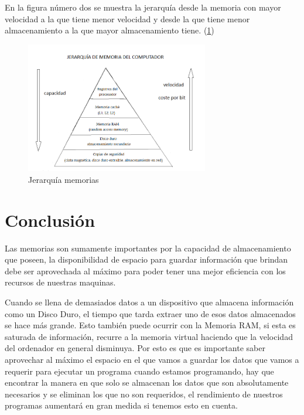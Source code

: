 \documentclass{article}
\begin{document}
En la figura número dos se muestra la jerarquía desde la memoria con mayor velocidad a la que tiene menor velocidad y desde la que tiene menor almacenamiento a la que mayor almacenamiento tiene. (\ref{fig:jerarquia})

\begin{figure}[h]
\includegraphics[width=8cm]{jerarquia.png}
\centering
\caption{Jerarquía memorias}
\label{fig:jerarquia}
\end{figure}


\section{Conclusión} \label{conclulsion}

Las memorias son sumamente importantes por la capacidad de almacenamiento que poseen, la disponibilidad de espacio para guardar información que brindan debe ser aprovechada al máximo para poder tener una mejor eficiencia con los recursos de nuestras maquinas.

Cuando se llena de demasiados datos a un dispositivo que almacena información como un Disco Duro, el tiempo que tarda extraer uno de esos datos almacenados se hace más grande. Esto también puede ocurrir con la Memoria RAM, si esta es saturada de información, recurre a la memoria virtual haciendo que la velocidad del ordenador en general disminuya. Por esto es que es importante saber aprovechar al máximo el espacio en el que vamos a guardar los datos que vamos a requerir para ejecutar un programa cuando estamos programando, hay que encontrar la manera en que solo se almacenan los datos que son absolutamente necesarios y se eliminan los que no son requeridos, el rendimiento de nuestros programas aumentará en gran medida si tenemos esto en cuenta. 




\end{document}
